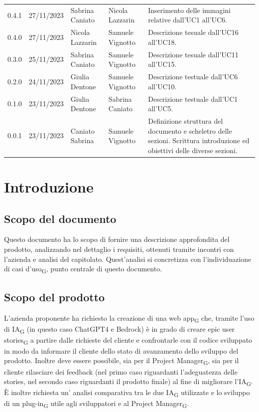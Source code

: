 \documentclass{article}
\begin{document}
\begin{center}
\begin{tabular}{P{4em} P{6em} P{7em} P{7em} P{11em}} 
    0.4.1 & 27/11/2023 & Sabrina Caniato & Nicola Lazzarin & Inserimento delle immagini relative dall'UC1 all'UC6.\\
    0.4.0 & 27/11/2023 & Nicola Lazzarin & Samuele Vignotto & Descrizione tesuale dall'UC16 all'UC18. \\
    0.3.0 & 25/11/2023 & Sabrina Caniato & Samuele Vignotto & Descrizione tesuale dall'UC11 all'UC15. \\
    0.2.0 & 24/11/2023 & Giulia Dentone & Samuele Vignotto & Descrizione testuale dall'UC6 all'UC10.\\ 
    0.1.0 & 23/11/2023 & Giulia Dentone & Sabrina Caniato & Descrizione testuale dall'UC1 all'UC5.\\
    0.0.1 & 23/11/2023 & Caniato Sabrina  & Samuele Vignotto & Definizione struttura del documento e scheletro delle sezioni. Scrittura introduzione ed obiettivi delle diverse sezioni.\\ 
\end{tabular}
\end{center}
\newpage
\tableofcontents
\listoffigures
\listoftables
\newpage
\section*{Introduzione}

\subsection*{Scopo del documento}

Questo documento ha lo scopo di fornire una descrizione approfondita del prodotto, analizzando nel dettaglio i requisiti, ottenuti tramite incontri con l'azienda e analisi del capitolato. Quest'analisi si concretizza con l'individuazione di casi d'uso\textsubscript{G}, punto centrale di questo documento.


\subsection*{Scopo del prodotto}
L'azienda proponente ha richiesto la creazione di una web app\textsubscript{G} che, tramite l'uso di IA\textsubscript{G} (in questo caso ChatGPT4 e Bedrock) è in grado di creare epic user stories\textsubscript{G} a partire dalle richieste del cliente e confrontarle con il codice sviluppato in modo da informare il cliente dello stato di avanzamento dello sviluppo del prodotto. Inoltre deve essere possibile, sia per il Project Manager\textsubscript{G}, sia per il cliente rilasciare dei feedback (nel primo caso riguardanti l'adeguatezza delle stories, nel secondo caso riguardanti il prodotto finale) al fine di migliorare l'IA\textsubscript{G}. È inoltre richiesta un' analisi comparativa tra le due IA\textsubscript{G} utilizzate e lo sviluppo di un plug-in\textsubscript{G} utile agli sviluppatori e al Project Manager\textsubscript{G}.
\end{document}
